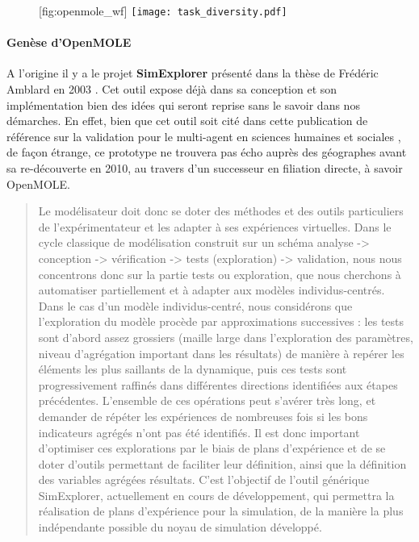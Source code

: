 \begin{figure}[!htbp]
	\begin{sidecaption}[fortoc]{}[fig:openmole_wf]
		\centering
		\texttt{[image: task\_diversity.pdf]}{
		}
  \end{sidecaption}
\end{figure}

\paragraph {Genèse d'OpenMOLE}

A l'origine il y a le projet \textbf{SimExplorer} présenté dans la thèse de  Frédéric Amblard en 2003 \autocite{Amblard2003}. Cet outil expose déjà dans sa conception et son implémentation bien des idées qui seront reprise sans le savoir dans nos démarches. En effet, bien que cet outil soit cité dans cette publication de référence sur la validation pour le multi-agent en sciences humaines et sociales \autocite{Amblard2006}, de façon étrange, ce prototype ne trouvera pas écho auprès des géographes avant sa re-découverte en 2010, au travers d'un successeur en filiation directe, à savoir OpenMOLE.

\blockquote[\cite{Amblard2002}]{Le modélisateur doit donc se doter des méthodes et des outils particuliers de l’expérimentateur et les adapter à ses expériences virtuelles. Dans le cycle classique de modélisation construit sur un schéma analyse -> conception -> vérification -> tests (exploration) -> validation, nous nous concentrons donc sur la partie tests ou exploration, que nous cherchons à automatiser partiellement et à adapter aux modèles individus-centrés. Dans le cas d’un modèle individus-centré, nous considérons que l’exploration du modèle procède par approximations successives : les tests sont d’abord assez grossiers (maille large dans l’exploration des paramètres, niveau d’agrégation important dans les résultats) de manière à repérer les éléments les plus saillants de la dynamique, puis ces tests sont progressivement raffinés dans différentes directions identifiées aux étapes précédentes. L’ensemble de ces opérations peut s’avérer très long, et demander de répéter les expériences de nombreuses fois si les bons indicateurs agrégés n’ont pas été identifiés. Il est donc important d’optimiser ces explorations par le biais de plans d’expérience et de se doter d’outils permettant de faciliter leur définition, ainsi que la définition des variables agrégées résultats. C’est l’objectif de l’outil générique SimExplorer, actuellement en cours de développement, qui permettra la réalisation de plans d’expérience pour la simulation, de la manière la plus indépendante possible du noyau de simulation développé.}

